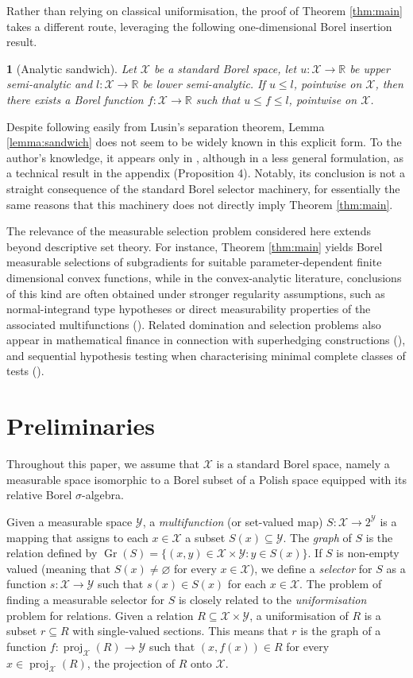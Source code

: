 \documentclass[10pt, a4paper]{article}
\newcommand{\R}{\mathbb R}
\newcommand{\X}{\mathcal X}
\newcommand{\Y}{\mathcal Y}
\newcommand{\reptile}{}
\newtheorem*{repinner}{\reptile}
\newenvironment{reflem}[1]{%
  \renewcommand{\reptile}{Lemma \ref{#1}}%
  \begin{repinner}
}{%
  \end{repinner}
}
\begin{document}
Rather than relying on classical uniformisation, the proof of Theorem \ref{thm:main} takes a different route, leveraging the following one-dimensional Borel insertion result.
\begin{reflem}{lemma:sandwich}[Analytic sandwich]
Let $\X$ be a standard Borel space, let $u:\X\to\R$ be upper semi-analytic and $l:\X\to\R$ be lower semi-analytic. If $u\leq l$, pointwise on $\X$, then there exists a Borel function $f:\X\to\R$ such that $u\leq f\leq l$, pointwise on $\X$.
\end{reflem}
Despite following easily from Lusin's separation theorem,  Lemma \ref{lemma:sandwich} does not seem to be widely known in this explicit form. To the author's knowledge, it appears only in \cite{clerico2025optimality}, although in a less general formulation, as a technical result in the appendix (Proposition 4). Notably, its conclusion is not a straight consequence of the standard Borel selector machinery, for essentially the same reasons that this machinery does not directly imply Theorem \ref{thm:main}. 

The relevance of the measurable selection problem considered here extends beyond descriptive set theory. For instance, Theorem \ref{thm:main} yields Borel measurable selections of subgradients for suitable parameter-dependent finite dimensional convex functions, while in the  convex-analytic literature, conclusions of this kind are often obtained under stronger regularity assumptions, such as normal-integrand type hypotheses or direct measurability properties of the associated multifunctions (\cite{rockafellar1969measurable,hess1995measurability}). Related domination and selection problems also appear in mathematical finance in connection with superhedging constructions (\cite{bouchard2015arbitrage}), and sequential hypothesis testing when characterising minimal complete classes of tests (\cite{clerico2025optimality}).
\section{Preliminaries}

Throughout this paper, we assume that $\X$ is a standard Borel space, namely a measurable space isomorphic to a Borel subset of a Polish space equipped with its relative Borel $\sigma$-algebra. 

Given a measurable space $\Y$, a \emph{multifunction} (or set-valued map) $S : \X \to 2^\Y$ is a mapping that assigns to each $x \in \X$ a subset $S(x) \subseteq \Y$. The \emph{graph} of $S$ is the relation defined by $\operatorname{Gr}(S) = \{(x, y) \in \X \times \Y : y \in S(x)\}$. If $S$ is non-empty valued (meaning that $S(x) \neq \varnothing$ for every $x \in \X$), we define a \emph{selector} for $S$ as a function $s : \X \to \Y$ such that $s(x) \in S(x)$ for each $x \in \X$. The problem of finding a measurable selector for $S$ is closely related to the \emph{uniformisation} problem for relations. Given a relation $R \subseteq \X \times \Y$, a uniformisation of $R$ is a subset $r \subseteq R$ with single-valued sections. This means that $r$ is the graph of a function $f : \operatorname{proj}_{\X}(R) \to \Y$ such that $(x, f(x)) \in R$ for every $x \in \operatorname{proj}_{\X}(R)$, the projection of $R$ onto $\X$. 
\end{document}
